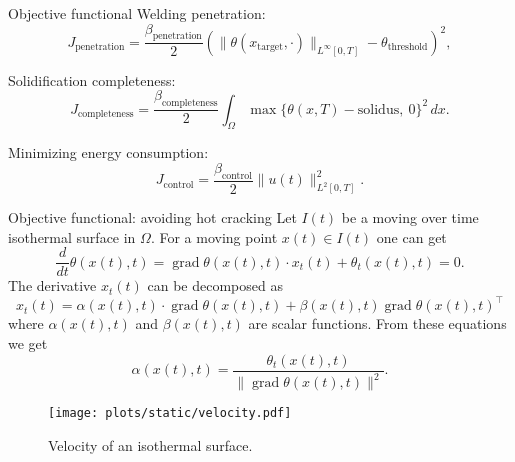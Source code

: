 \documentclass[
	9pt,
	hyperref = {unicode,pdfpagelabels=false},
	notheorems,
	aspectratio=169
	]{beamer}
\DeclareMathOperator{\grad}{grad}
\begin{document}
\begin{frame}{Objective functional}
	Welding penetration:
	\begin{equation}
		J_{\text{penetration}} = \frac{\beta_\text{penetration}}{2} \left( \| \theta(x_{\text{target}},\cdot) \|_{L^{\infty}[0,T]} - \theta_{\text{threshold}} \right)^2,
	\end{equation}

	Solidification completeness:
	\begin{equation}
		J_{\text{completeness}} =
		\frac{\beta_\text{completeness}}{2} \int_{\Omega} \max\{ \theta(x, T) - \text{solidus},\ 0 \}^2\, dx.
	\end{equation}

	Minimizing energy consumption:
	\begin{equation}
		J_\text{control} =
		\frac{\beta_\text{control}}{2} \|u(t)\|^2_{L^2[0,T]}.
	\end{equation}
\end{frame}


\begin{frame}{Objective functional: avoiding hot cracking}
Let $I(t)$ be a moving over time isothermal surface in $\Omega$. For a moving point $x(t) \in I(t)$ one can get
\begin{equation} \label{eq:dxt}
	\frac{d}{dt} \theta(x(t),t) = \grad \theta(x(t),t) \cdot x_t(t) + \theta_t(x(t),t) = 0.
\end{equation}
The derivative $x_t(t)$ can be decomposed as
\begin{equation} \label{eq:xt_alpha_beta}
	x_t(t) = \alpha(x(t),t) \cdot \grad \theta(x(t),t) + \beta(x(t),t) \grad \theta(x(t),t)^{\top}
\end{equation}
where $\alpha(x(t),t)$ and $\beta(x(t),t)$ are scalar functions. From these equations we get
\begin{equation}
	\alpha(x(t),t) = \frac{\theta_t(x(t),t)}{\|\grad \theta(x(t),t)\|^2}.
\end{equation}
	\vspace{-2em}
	\begin{figure}
		\centering
		\texttt{[image: plots/static/velocity.pdf]}\\
		\vspace{-2em}
		\caption{Velocity of an isothermal surface.}
	\end{figure}
\end{frame}
\end{document}
